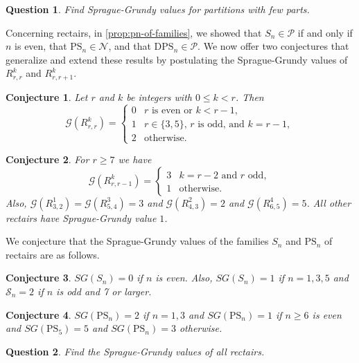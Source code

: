 \documentclass[pdflatex,sn-mathphys-num]{sn-jnl}%
\theoremstyle{thmstyleone}%
\theoremstyle{thmstyletwo}%
\theoremstyle{thmstylethree}%
\newtheorem{conj}{Conjecture}
\newtheorem{question}{Question}
\newcommand{\p}{\mathcal P}
\newcommand{\n}{\mathcal N}
\newcommand{\sg}{\mathcal{G}}
\newcommand{\dps}{\mathrm{DPS}}
\newcommand{\ps}{\mathrm{PS}}
\newcommand{\s}{S}
\begin{document}
\begin{question}
    Find Sprague-Grundy values for partitions with few parts. 
\end{question}

\medskip
Concerning rectairs, in \cref{prop:pn-of-families}, we showed that $S_n \in \p$ if and only if $n$ is even, that $\ps_n \in \n$, and that $\dps_n \in \p$. 
We now offer two conjectures that generalize and extend these results by postulating the Sprague-Grundy values of $R^k_{r, r}$ and $R^k_{r, r+1}$. 

\begin{conj} Let $r$ and $k$ be integers with $0 \leq k < r$. Then
    \[
    \sg(R_{r, r}^k)=
    \begin{cases}
        0& r \text{ is even or }k<r-1,\\
        1& r\in \{3,5\}, \, r \text{ is odd, and } k = r-1,\\
        2& \text{otherwise.}
    \end{cases}    
    \]
\end{conj}

\begin{conj} For $r \geq 7$ we have \[\sg(R_{r,r-1}^k)=
    \begin{cases}
    3& k=r-2 \text{ and } r \text{ odd},\\
    1& \text{otherwise.}
    \end{cases}\]
Also, $\sg(R^1_{3, 2}) = \sg(R^3_{5, 4}) = 3$ and $\sg(R^2_{4, 3}) = 2$ and $\sg(R^4_{6, 5} )= 5$. All other rectairs have Sprague-Grundy value $1$. 
\end{conj}

We conjecture that the Sprague-Grundy values of the families $\s_n$ and $\ps_n$ of rectairs are as follows. 
\begin{conj} 
$SG(\s_n) = 0$ if $n$ is even. Also, $SG(\s_n) = 1$ if $n = 1, 3, 5$ and $\mathcal \s_n = 2$ if $n$ is odd and 7 or larger. 
\end{conj}

\begin{conj}
    $SG(\mathcal{\ps}_n) = 2$ if $n = 1, 3$ and $SG(\mathcal{\ps}_n) = 1$ if $n \geq 6$ is even and $SG(\mathcal{\ps}_5) = 5$ and $SG(\mathcal{\ps}_n) = 3$ otherwise. 
\end{conj}


\begin{question}
Find the Sprague-Grundy values of all rectairs. 
\end{question} 
\end{document}
